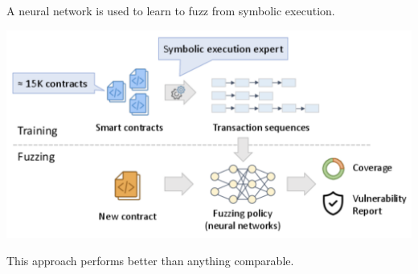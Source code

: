 A neural network is used to learn to fuzz from symbolic execution.
\begin{center}
	\includegraphics[width=0.9\columnwidth]{assets/ilf}
\end{center}

This approach performs better than anything comparable.